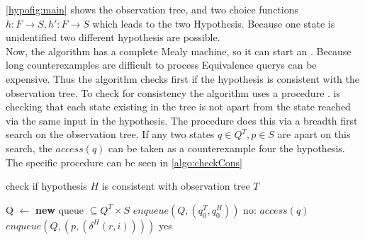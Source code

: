 \autoref{hypofig:main} shows the observation tree, and two choice functions $h:F\rightarrow S, h':F\rightarrow S$ which leads to the two Hypothesis. Because one state is unidentified two different hypothesis are possible.\\ 
Now, the algorithm has a complete Mealy machine, so it can start an \equery. Because long counterexamples are difficult to process Equivalence querys can be expensive. Thus the algorithm checks first if the hypothesis is consistent with the observation tree. To check for consistency the algorithm uses a procedure \chcons. \chcons \space is checking that each state existing in the tree is not apart from the state reached via the same input in the hypothesis. The procedure does this via a breadth first search on the observation tree. If any two states $q\in Q^T, p \in S$ are apart on this search, the $access(q)$ can be taken as a counterexample four the hypothesis. The specific procedure can be seen in \autoref{algo:checkCons}
\begin{algorithm}[b]
	\caption{check if hypothesis $H$ is consistent with observation tree $T$}
	\label{algo:checkCons}
	\begin{algorithmic}
		\State Q $\gets$ \textbf{new} queue $\subseteq Q^T \times S$
		 \State $enqueue(Q,(q_0^T,q_0^H))$
		 	\Return no: $access(q)$
		 	\EndIf
		 	\State $enqueue(Q,(p,(\delta^H(r,i))))$
		 	\EndFor
		 \EndWhile
		 \Return yes
		 \EndProcedure
	\end{algorithmic}
\end{algorithm}

